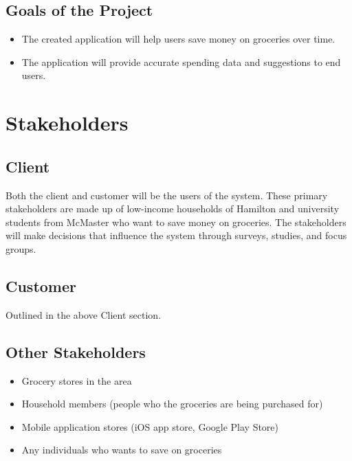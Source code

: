 \documentclass[12pt]{article}
\begin{document}
\subsection{Goals of the Project}
\begin{itemize}
  \item The created application will help users save money on groceries over time.
  \item The application will provide accurate spending data and suggestions to end users.
\end{itemize}  
\section{Stakeholders}
\subsection{Client}
Both the client and customer will be the users of the system. These primary stakeholders are made up of low-income households of Hamilton and university students from McMaster who want to save money on groceries. The stakeholders will make decisions that influence the system through surveys, studies, and focus groups.
\subsection{Customer}
Outlined in the above Client section.
\subsection{Other Stakeholders}
\begin{itemize}
  \item Grocery stores in the area
  \item Household members (people who the groceries are being purchased for)
  \item Mobile application stores (iOS app store, Google Play Store)
  \item Any individuals who wants to save on groceries
\end{itemize}
\end{document}
